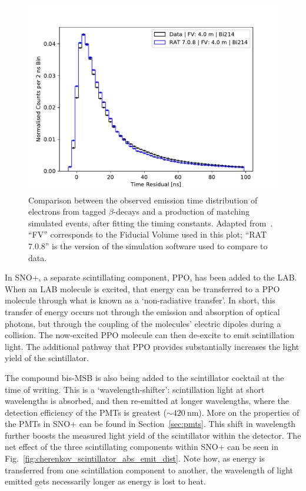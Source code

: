 \begin{figure}[!th]
    \centering
    \includegraphics[width=0.8\linewidth]{2_Detector/Figs/daniel_old_tuning_250Cut_2ns.pdf}
    \caption[Comparison between the observed emission time of  $\beta$-decays in data versus MC]
    {Comparison between the observed emission time distribution of electrons from tagged  $\beta$-decays and a production of matching simulated events, after fitting the timing constants. Adapted from~\cite{hunt-stokesEmissionTimingTuning2022}.%
    ``FV'' corresponds to the Fiducial Volume used in this plot; ``RAT 7.0.8'' is the version of the simulation software used to compare to data.
    }
    \label{fig:typical_tres_dist_physics}
\end{figure}

In SNO+, a separate scintillating component, PPO, has been added to the LAB. When an LAB molecule is excited, that energy can be transferred to a PPO molecule through what is known as a `non-radiative transfer'. In short, this transfer of energy occurs not through the emission and absorption of optical photons, but through the coupling of the molecules' electric dipoles during a collision. The now-excited PPO molecule can then de-excite to emit scintillation light. The additional pathway that PPO provides substantially increases the light yield of the scintillator.

The compound bis-MSB is also being added to the scintillator cocktail at the time of writing. This is a `wavelength-shifter': scintillation light at short wavelengths is absorbed, and then re-emitted at longer wavelengths, where the detection efficiency of the PMTs is greatest ($\sim\SI{420}{\nm}$). More on the properties of the PMTs in SNO+ can be found in Section~\ref{sec:pmts}. This shift in wavelength further boosts the measured light yield of the scintillator within the detector. The net effect of the three scintillating components within SNO+ can be seen in Fig.~\ref{fig:cherenkov_scintillator_abs_emit_dist}. Note how, as energy is transferred from one scintillation component to another, the wavelength of light emitted gets necessarily longer as energy is lost to heat.

